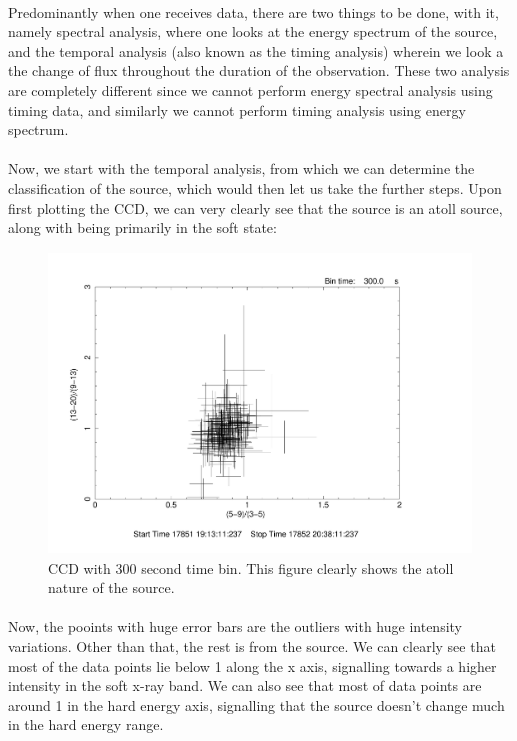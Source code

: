\documentclass[a4paper,twoside]{report}
\numberwithin{equation}{section}
\begin{document}
\paragraph{}
Predominantly when one receives data, there are two things to be done, with it, namely spectral analysis, where one looks at the energy spectrum of the source, and the temporal analysis (also known as the timing analysis) wherein we look a the change of flux throughout the duration of the observation. These two analysis are completely different since we cannot perform energy spectral analysis using timing data, and similarly we cannot perform timing analysis using energy spectrum. 
\paragraph{}
Now, we start with the temporal analysis, from which we can determine the classification of the source, which would then let us take the further steps. Upon first plotting the CCD, we can very clearly see that the source is an atoll source, along with being primarily in the soft state:
\begin{figure}[h]
\begin{center}
\includegraphics[width=0.8\linewidth, height=8cm]{CCD_300.pdf}
\caption{CCD with 300 second time bin. This figure clearly shows the atoll nature of the source.}
\label{CCD_300s}
\end{center}
\end{figure}
\paragraph{}
Now, the pooints with huge error bars are the outliers with huge intensity variations. Other than that, the rest is from the source. We can clearly see that most of the data points lie below 1 along the x axis, signalling towards a higher intensity in the soft x-ray band. We can also see that most of data points are around 1 in the hard energy axis, signalling that the source doesn't change much in the hard energy range. 
\end{document}
